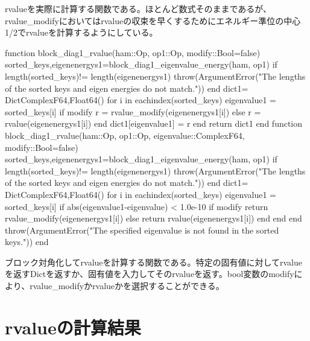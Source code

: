 \documentclass{ltjsarticle}
\begin{document}
rvalueを実際に計算する関数である。ほとんど数式そのままであるが、rvalue\_modifyにおいてはrvalueの収束を早くするためにエネルギー準位の中心1/2でrvalueを計算するようにしている。\\
\begin{jllisting}
function block_diag1_rvalue(ham::Op, op1::Op, modify::Bool=false)
  sorted_keys,eigenenergys1=block_diag1_eigenvalue_energy(ham, op1)
  if length(sorted_keys)!= length(eigenenergys1)
    throw(ArgumentError("The lengths of the sorted keys and eigen energies do not match."))
  end
  dict1= Dict{ComplexF64,Float64}()
  for i in eachindex(sorted_keys)
    eigenvalue1 = sorted_keys[i]
    if modify
      r = rvalue_modify(eigenenergys1[i])
    else
      r = rvalue(eigenenergys1[i])
    end
    dict1[eigenvalue1] = r
  end
  return dict1
end
function block_diag1_rvalue(ham::Op, op1::Op, eigenvalue::ComplexF64, modify::Bool=false)
  sorted_keys,eigenenergys1=block_diag1_eigenvalue_energy(ham, op1)
  if length(sorted_keys)!= length(eigenenergys1)
    throw(ArgumentError("The lengths of the sorted keys and eigen energies do not match."))
  end
  dict1= Dict{ComplexF64,Float64}()
  for i in eachindex(sorted_keys)
    eigenvalue1 = sorted_keys[i]
    if abs(eigenvalue1-eigenvalue) < 1.0e-10
      if modify
        return rvalue_modify(eigenenergys1[i])
      else
        return rvalue(eigenenergys1[i])
      end
    end
  end
  throw(ArgumentError("The specified eigenvalue is not found in the sorted keys."))
end
\end{jllisting}
ブロック対角化してrvalueを計算する関数である。特定の固有値に対してrvalueを返すDictを返すか、固有値を入力してそのrvalueを返す。bool変数のmodifyにより、rvalue\_modifyかrvalueかを選択することができる。\\
\section{rvalueの計算結果}
\end{document}
